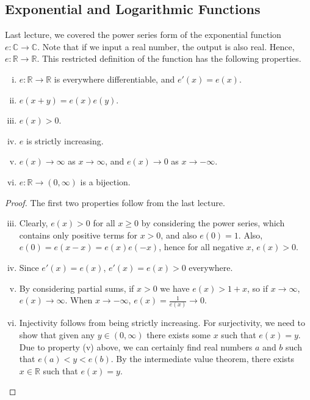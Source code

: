 \subsection{Exponential and Logarithmic Functions}
Last lecture, we covered the power series form of the exponential function \(e \colon \mathbb C \to \mathbb C\).
Note that if we input a real number, the output is also real.
Hence, \(e \colon \mathbb R \to \mathbb R\).
This restricted definition of the function has the following properties.
\begin{theorem}
	\begin{enumerate}[(i)]
		\item \(e \colon \mathbb R \to \mathbb R\) is everywhere differentiable, and \(e'(x) = e(x)\).
		\item \(e(x+y) = e(x)e(y)\).
		\item \(e(x) > 0\).
		\item \(e\) is strictly increasing.
		\item \(e(x) \to \infty\) as \(x \to \infty\), and \(e(x) \to 0\) as \(x \to -\infty\).
		\item \(e \colon \mathbb R \to (0, \infty)\) is a bijection.
	\end{enumerate}
\end{theorem}
\begin{proof}
	The first two properties follow from the last lecture.
	\begin{enumerate}[(i)]
		\setcounter{enumi}{2}
		\item Clearly, \(e(x) > 0\) for all \(x \geq 0\) by considering the power series, which contains only positive terms for \(x>0\), and also \(e(0) = 1\).
		      Also, \(e(0) = e(x - x) = e(x)e(-x)\), hence for all negative \(x\), \(e(x) > 0\).
		\item Since \(e'(x) = e(x)\), \(e'(x) = e(x) > 0\) everywhere.
		\item By considering partial sums, if \(x>0\) we have \(e(x) > 1+x\), so if \(x \to \infty\), \(e(x) \to \infty\).
		      When \(x \to -\infty\), \(e(x) = \frac{1}{e(x)} \to 0\).
		\item Injectivity follows from being strictly increasing.
		      For surjectivity, we need to show that given any \(y \in (0, \infty)\) there exists some \(x\) such that \(e(x) = y\).
		      Due to property (v) above, we can certainly find real numbers \(a\) and \(b\) such that \(e(a) < y < e(b)\).
		      By the intermediate value theorem, there exists \(x \in \mathbb R\) such that \(e(x) = y\).
	\end{enumerate}
\end{proof}

